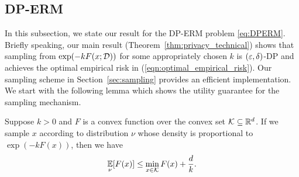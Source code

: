 
\subsection{DP-ERM}
In this subsection, we state our result for the DP-ERM problem \eqref{eq:DPERM}.
Briefly speaking, our main result (Theorem~\ref{thm:privacy_technical}) shows that sampling from $\exp(-kF(x;\mathcal D))$ for some appropriately chosen $k$ is $(\varepsilon,\delta)$-DP and achieves the optimal empirical risk in (\ref{eqn:optimal_empirical_risk}).
Our sampling scheme in Section~\ref{sec:sampling} provides an efficient implementation. We start with the following lemma which shows the utility guarantee for the sampling mechanism.

\begin{lemma}
\label{lm:utility_tech}
Suppose $k>0$ and $F$ is a convex function over the convex set $\mathcal K\subseteq \mathbb{R}^d$. If we sample $x$ according to distribution $\nu$ whose density is proportional to $\exp(-k F(x))$, then we have
\begin{align*}
    \operatorname*{\mathbb{E}}_{\nu}[F(x)]\leq \min_{x\in\mathcal K}F(x)+\frac{d}{k}.
\end{align*}
\end{lemma}

